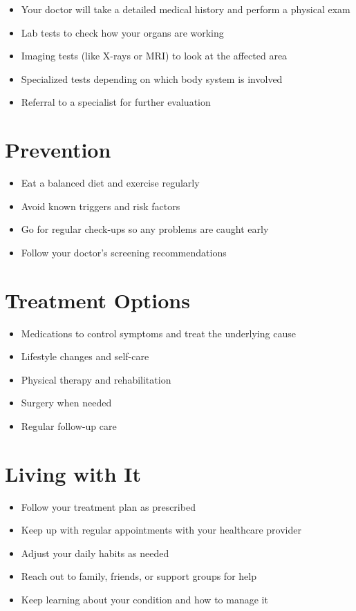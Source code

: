 \begin{itemize}[noitemsep]
  \item Your doctor will take a detailed medical history and perform a physical exam
  \item Lab tests to check how your organs are working
  \item Imaging tests (like X-rays or MRI) to look at the affected area
  \item Specialized tests depending on which body system is involved
  \item Referral to a specialist for further evaluation
\end{itemize}

\section{Prevention}

\begin{itemize}[noitemsep]
  \item Eat a balanced diet and exercise regularly
  \item Avoid known triggers and risk factors
  \item Go for regular check-ups so any problems are caught early
  \item Follow your doctor's screening recommendations
\end{itemize}

\section{Treatment Options}

\begin{itemize}[noitemsep]
  \item Medications to control symptoms and treat the underlying cause
  \item Lifestyle changes and self-care
  \item Physical therapy and rehabilitation
  \item Surgery when needed
  \item Regular follow-up care
\end{itemize}

\section{Living with It}

\begin{itemize}[noitemsep]
  \item Follow your treatment plan as prescribed
  \item Keep up with regular appointments with your healthcare provider
  \item Adjust your daily habits as needed
  \item Reach out to family, friends, or support groups for help
  \item Keep learning about your condition and how to manage it
\end{itemize}


